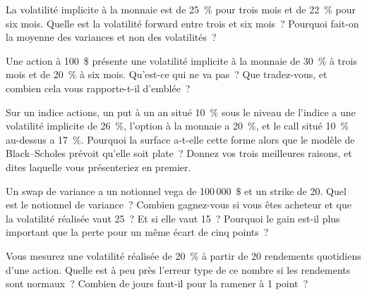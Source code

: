 \begin{question}\label{iq:iv2:vol-surface-and-vol-trading:4}
La volatilité implicite à la monnaie est de 25~\% pour trois mois et de 22~\% pour six mois. Quelle est la volatilité forward entre trois et six mois~? Pourquoi fait-on la moyenne des variances et non des volatilités~?
\end{question}

\begin{question}\label{iq:iv2:vol-surface-and-vol-trading:5}
Une action à 100~\$ présente une volatilité implicite à la monnaie de 30~\% à trois mois et de 20~\% à six mois. Qu'est-ce qui ne va pas~? Que tradez-vous, et combien cela vous rapporte-t-il d'emblée~?
\end{question}

\begin{question}\label{iq:iv2:vol-surface-and-vol-trading:6}
Sur un indice actions, un put à un an situé 10~\% sous le niveau de l'indice a une volatilité implicite de 26~\%, l'option à la monnaie a 20~\%, et le call situé 10~\% au-dessus a 17~\%. Pourquoi la surface a-t-elle cette forme alors que le modèle de Black--Scholes prévoit qu'elle soit plate~? Donnez vos trois meilleures raisons, et dites laquelle vous présenteriez en premier.
\end{question}

\begin{question}\label{iq:iv2:vol-surface-and-vol-trading:7}
Un swap de variance a un notionnel vega de 100\,000~\$ et un strike de 20. Quel est le notionnel de variance~? Combien gagnez-vous si vous êtes acheteur et que la volatilité réalisée vaut 25~? Et si elle vaut 15~? Pourquoi le gain est-il plus important que la perte pour un même écart de cinq points~?
\end{question}

\begin{question}\label{iq:iv2:vol-surface-and-vol-trading:8}
Vous mesurez une volatilité réalisée de 20~\% à partir de 20 rendements quotidiens d'une action. Quelle est à peu près l'erreur type de ce nombre si les rendements sont normaux~? Combien de jours faut-il pour la ramener à 1 point~?
\end{question}

